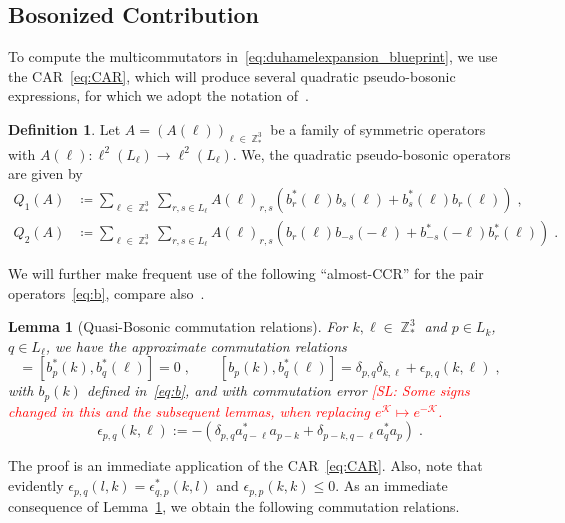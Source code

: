 \documentclass[12pt,a4paper]{article}
\numberwithin{equation}{section}
\newcommand{\cK}{\mathcal{K}}
\newcommand{\1}{\mathbb{I}}
\DeclareMathOperator{\Z}{\mathbb{Z}}
\theoremstyle{plain}
\newtheorem{lemma}[theorem]{Lemma}
\theoremstyle{definition}
\newtheorem{definition}[theorem]{Definition}
\theoremstyle{remark}
\theoremstyle{plain}
\theoremstyle{definition}
\theoremstyle{remark}
\begin{document}
\subsection{Bosonized Contribution}
\label{sec:extraction_bos}

To compute the multicommutators in~\eqref{eq:duhamelexpansion_blueprint}, we use the CAR~\eqref{eq:CAR}, which will produce several quadratic pseudo-bosonic expressions, for which we adopt the notation of~\cite{CHN21}.

\begin{definition} \label{def:Q}
Let $A=(A(\ell))_{\ell \in \Z^3_*} $ be a family of symmetric operators with $A(\ell): \ell^2(L_\ell)\rightarrow \ell^2(L_\ell)$. We, the quadratic pseudo-bosonic operators are given by
\begin{equation} \label{eq:Q}
\begin{aligned}
    Q_1(A)&\coloneq  \sum\limits_{\ell \in \Z^3_*}\sum\limits_{r,s \in L_{\ell}}A(\ell)_{r,s} \left(b^*_r(\ell)b_{s}(\ell)+b^*_{s}(\ell)b_{r}(\ell)\right) \;,\\ 
    Q_2(A)&\coloneq  \sum\limits_{\ell \in \Z^3_*}\sum\limits_{r,s \in L_{\ell}}A(\ell)_{r,s} \left(b_r(\ell)b_{-s}(-\ell)+b^*_{-s}(-\ell)b^*_{r}(\ell)\right) \;.
\end{aligned}
\end{equation} 
\end{definition}
We will further make frequent use of the following ``almost-CCR'' for the pair operators~\eqref{eq:b}, compare also~\cite[(1.66)]{CHN21}.

\begin{lemma}[Quasi-Bosonic commutation relations]\label{lem:paircomm}
For $k,\ell \in \Z^3_*$ and $p \in L_{k}$, $q\in L_{\ell}$, we have the approximate commutation relations
\begin{equation}
       [b_{p}(k),b_{q}(\ell)] = [b^*_{p}(k),b^*_{q}(\ell)] = 0 \;, \qquad
       [b_{p}(k),b^*_{q}(\ell)] = \delta_{p,q}\delta_{k,\ell} + \epsilon_{p,q}(k,\ell) \;,
\end{equation}
with $ b_p(k) $ defined in~\eqref{eq:b}, and with commutation error \textcolor{red}{[SL: Some signs changed in this and the subsequent lemmas, when replacing $ e^{\cK} \mapsto e^{-\cK} $.}
\begin{equation}
	\epsilon_{p,q}(k,\ell)
	:= -\left(\delta_{p,q}a^*_{q-\ell}a_{p-k} + \delta_{p-k,q-\ell}a^*_{q}a_{p}\right) \;.
\end{equation}
\end{lemma}
The proof is an immediate application of the CAR~\eqref{eq:CAR}. Also, note that evidently $\epsilon_{p,q}(l,k) = \epsilon^*_{q,p}(k,l) $ and $\epsilon_{p,p}(k,k)\leq 0$. As an immediate consequence of Lemma~\ref{lem:paircomm}, we obtain the following commutation relations.
\end{document}
